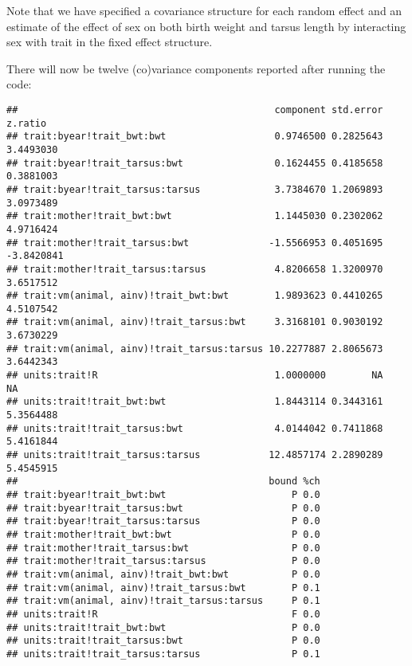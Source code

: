 \documentclass[12pt,]{book}
\newenvironment{Shaded}{\begin{snugshade}}{\end{snugshade}}
\newcommand{\KeywordTok}[1]{\textcolor[rgb]{0.13,0.29,0.53}{\textbf{#1}}}
\newcommand{\NormalTok}[1]{#1}
\newcommand{\OperatorTok}[1]{\textcolor[rgb]{0.81,0.36,0.00}{\textbf{#1}}}
\begin{document}
Note that we have specified a covariance structure for each random effect and an estimate of the effect of sex on both birth weight and tarsus length by interacting sex with trait in the fixed effect structure.

There will now be twelve (co)variance components reported after running the code:

\begin{Shaded}
\end{Shaded}

\begin{verbatim}
##                                             component std.error    z.ratio
## trait:byear!trait_bwt:bwt                   0.9746500 0.2825643  3.4493030
## trait:byear!trait_tarsus:bwt                0.1624455 0.4185658  0.3881003
## trait:byear!trait_tarsus:tarsus             3.7384670 1.2069893  3.0973489
## trait:mother!trait_bwt:bwt                  1.1445030 0.2302062  4.9716424
## trait:mother!trait_tarsus:bwt              -1.5566953 0.4051695 -3.8420841
## trait:mother!trait_tarsus:tarsus            4.8206658 1.3200970  3.6517512
## trait:vm(animal, ainv)!trait_bwt:bwt        1.9893623 0.4410265  4.5107542
## trait:vm(animal, ainv)!trait_tarsus:bwt     3.3168101 0.9030192  3.6730229
## trait:vm(animal, ainv)!trait_tarsus:tarsus 10.2277887 2.8065673  3.6442343
## units:trait!R                               1.0000000        NA         NA
## units:trait!trait_bwt:bwt                   1.8443114 0.3443161  5.3564488
## units:trait!trait_tarsus:bwt                4.0144042 0.7411868  5.4161844
## units:trait!trait_tarsus:tarsus            12.4857174 2.2890289  5.4545915
##                                            bound %ch
## trait:byear!trait_bwt:bwt                      P 0.0
## trait:byear!trait_tarsus:bwt                   P 0.0
## trait:byear!trait_tarsus:tarsus                P 0.0
## trait:mother!trait_bwt:bwt                     P 0.0
## trait:mother!trait_tarsus:bwt                  P 0.0
## trait:mother!trait_tarsus:tarsus               P 0.0
## trait:vm(animal, ainv)!trait_bwt:bwt           P 0.0
## trait:vm(animal, ainv)!trait_tarsus:bwt        P 0.1
## trait:vm(animal, ainv)!trait_tarsus:tarsus     P 0.1
## units:trait!R                                  F 0.0
## units:trait!trait_bwt:bwt                      P 0.0
## units:trait!trait_tarsus:bwt                   P 0.0
## units:trait!trait_tarsus:tarsus                P 0.1
\end{verbatim}
\end{document}
